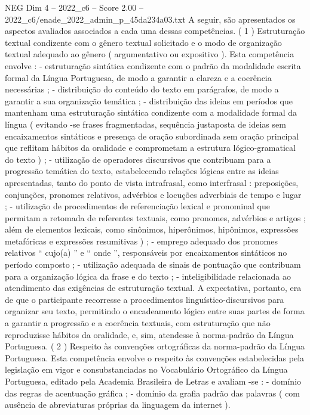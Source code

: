 \begin{textsample}{NEG Dim 4 – 2022\_c6 – Score 2.00 – 2022\_c6/enade\_2022\_admin\_p\_45da234a03.txt}
A seguir, são apresentados os aspectos avaliados associados a cada uma dessas competências. ( 1 ) Estruturação textual condizente com o gênero textual solicitado e o modo de organização textual adequado ao gênero ( argumentativo ou expositivo ).
Esta competência envolve : - estruturação sintática condizente com o padrão da modalidade escrita formal da Língua Portuguesa, de modo a garantir a clareza e a coerência necessárias ; - distribuição do conteúdo do texto em parágrafos, de modo a garantir a sua organização temática ; - distribuição das ideias em períodos que mantenham uma estruturação sintática condizente com a modalidade formal da língua ( evitando -se frases fragmentadas, sequência justaposta de ideias sem encaixamentos sintáticos e presença de oração subordinada sem oração principal que reflitam hábitos da oralidade e comprometam a estrutura lógico-gramatical do texto ) ; - utilização de operadores discursivos que contribuam para a progressão temática do texto, estabelecendo relações lógicas entre as ideias apresentadas, tanto do ponto de vista intrafrasal, como interfrasal : preposições, conjunções, pronomes relativos, advérbios e locuções adverbiais de tempo e lugar ; - utilização de procedimentos de referenciação lexical e pronominal que permitam a retomada de referentes textuais, como pronomes, advérbios e artigos ; além de elementos lexicais, como sinônimos, hiperônimos, hipônimos, expressões metafóricas e expressões resumitivas ) ; - emprego adequado dos pronomes relativos “ cujo(a) ” e “ onde ”, responsáveis por encaixamentos sintáticos no período composto ; - utilização adequada de sinais de pontuação que contribuam para a organização lógica da frase e do texto ; - inteligibilidade relacionada ao atendimento das exigências de estruturação textual.
A expectativa, portanto, era de que o participante recorresse a procedimentos linguístico-discursivos para organizar seu texto, permitindo o encadeamento lógico entre suas partes de forma a garantir a progressão e a coerência textuais, com estruturação que não reproduzisse hábitos da oralidade, e, sim, atendesse à norma-padrão da Língua Portuguesa. ( 2 ) Respeito às convenções ortográficas da norma-padrão da Língua Portuguesa.
Esta competência envolve o respeito às convenções estabelecidas pela legislação em vigor e consubstanciadas no Vocabulário Ortográfico da Língua Portuguesa, editado pela Academia Brasileira de Letras e avaliam -se : - domínio das regras de acentuação gráfica ; - domínio da grafia padrão das palavras ( com ausência de abreviaturas próprias da linguagem da internet ).

\end{textsample}
